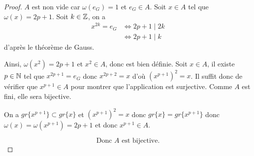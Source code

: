 \documentclass[12pt]{article}
\begin{document}
\begin{proof}
	$A$ est non vide car $\omega(e_{G})=1$ et $e_{G}\in A$. Soit $x\in A$ tel que $\omega(x)=2p+1$. Soit $k\in\mathbb{Z}$, on a 
	\begin{align}
		x^{2k}=e_{G}
		&\Leftrightarrow 2p+1\mid 2k\\
		&\Leftrightarrow 2p+1\mid k
	\end{align}
	d'après le théorème de Gauss.

	Ainsi, $\omega(x^{2})=2p+1$ et $x^{2}\in A$, donc  est bien définie. Soit $x\in A$, il existe $p\in\mathbb{N}$ tel que $x^{2p+1}=e_{G}$ donc $x^{2p+2}=x$ d'où $(x^{p+1})^{2}=x$. Il suffit donc de vérifier que $x^{p+1}\in A$ pour montrer que l'application est surjective. Comme $A$ est fini, elle sera bijective.

	On a $gr\{x^{p+1}\}\subset gr\{x\}$ et $(x^{p+1})^{2}=x$ donc $gr\{x\}=gr\{x^{p+1}\}$ donc $\omega(x)=\omega(x^{p+1})=2p+1$ et donc $x^{p+1}\in A$.

	\begin{equation}
		\boxed{\text{Donc }A\text{ est bijective.}}
	\end{equation}
\end{proof}
\end{document}
